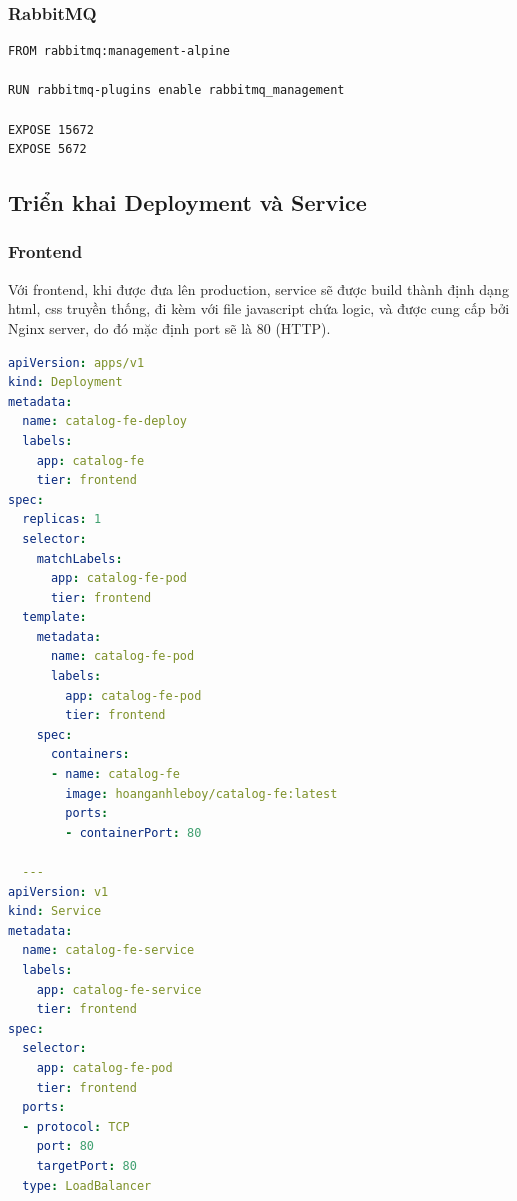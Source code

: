 \subsubsection*{RabbitMQ}
\begin{lstlisting}[language=docker]
FROM rabbitmq:management-alpine

RUN rabbitmq-plugins enable rabbitmq_management

EXPOSE 15672
EXPOSE 5672
\end{lstlisting}
\subsection{Triển khai Deployment và Service}
\subsubsection*{Frontend}
\noindent Với frontend, khi được đưa lên production, service sẽ được build thành định dạng html, css truyền thống, đi kèm với file javascript chứa logic, và được cung cấp bởi Nginx server, do đó mặc định port sẽ là 80 (HTTP).
\begin{lstlisting}[language=yaml]
apiVersion: apps/v1
kind: Deployment
metadata:
  name: catalog-fe-deploy
  labels:
    app: catalog-fe
    tier: frontend
spec:
  replicas: 1
  selector:
    matchLabels:
      app: catalog-fe-pod
      tier: frontend
  template:
    metadata:
      name: catalog-fe-pod
      labels:
        app: catalog-fe-pod
        tier: frontend
    spec:
      containers:
      - name: catalog-fe
        image: hoanganhleboy/catalog-fe:latest
        ports:
        - containerPort: 80

  ---
apiVersion: v1
kind: Service
metadata:
  name: catalog-fe-service
  labels:
    app: catalog-fe-service
    tier: frontend
spec:
  selector:
    app: catalog-fe-pod
    tier: frontend
  ports:
  - protocol: TCP
    port: 80
    targetPort: 80
  type: LoadBalancer
\end{lstlisting} 
